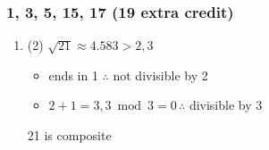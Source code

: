 \documentclass[12pt, A4]{article}
\begin{document}
			\subsubsection*{1, 3, 5, 15, 17 (19 extra credit)}
				\begin{enumerate}
					\item
						\begin{tasks}(2)
							\task
								\(\sqrt{21} \approx 4.583 > 2, 3\)
								\begin{itemize}[leftmargin = -0.25cm]
									\item
										ends in 1 \(\therefore\) not divisible by 2
									\item
										\(2 + 1 = 3, 3 \bmod 3 = 0 \, \therefore\) divisible by 3
								\end{itemize}
								21 is composite
							\task
						\end{tasks}
				\end{enumerate}
\end{document}

